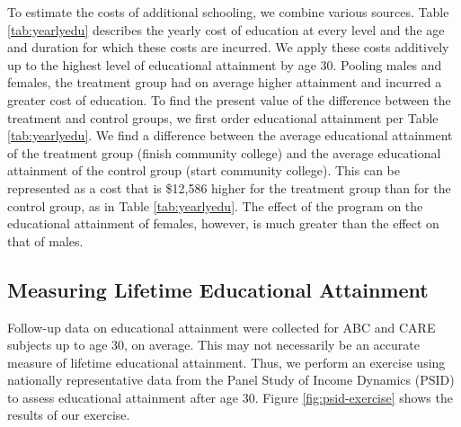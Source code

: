 \noindent To estimate the costs of additional schooling, we combine various sources. Table \ref{tab:yearlyedu}   describes the yearly cost of education at every level and the age and duration for which these costs are incurred. We apply these costs additively up to the highest level of educational attainment by age 30. Pooling males and females, the treatment group had on average higher attainment and incurred a greater cost of education. To find the present value of the difference between the treatment and control groups, we first order educational attainment per Table \ref{tab:yearlyedu}. We find a difference between the average educational attainment of the treatment group (finish community college) and the average educational attainment of the control group (start community college). This can be represented as a cost that is \$12,586 higher for the treatment group than for the control group, as in Table \ref{tab:yearlyedu}. The effect of the program on the educational attainment of females, however, is much greater than the effect on that of males.

\subsection{Measuring Lifetime Educational Attainment}

\noindent Follow-up data on educational attainment were collected for ABC and CARE subjects up to age 30, on average. This may not necessarily be an accurate measure of lifetime educational attainment. Thus, we perform an exercise using nationally representative data from the Panel Study of Income Dynamics (PSID) to assess educational attainment after age 30. Figure \ref{fig:psid-exercise} shows the results of our exercise. \\

